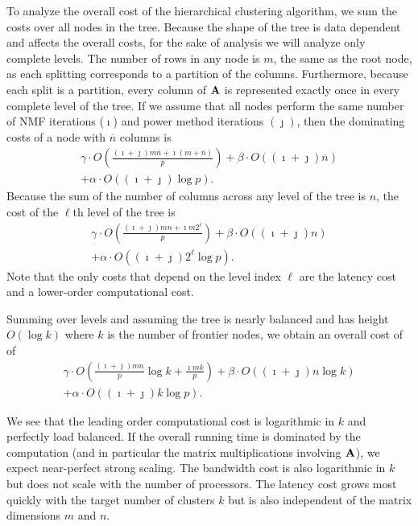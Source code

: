 \documentclass[conference,compsoc]{IEEEtran}
\begin{document}
To analyze the overall cost of the hierarchical clustering algorithm, we sum the costs over all nodes in the tree.
Because the shape of the tree is data dependent and affects the overall costs, for the sake of analysis we will analyze only complete levels.
The number of rows in any node is $m$, the same as the root node, as each splitting corresponds to a partition of the columns.
Furthermore, because each split is a partition, every column of $\M{A}$ is represented exactly once in every complete level of the tree.
If we assume that all nodes perform the same number of NMF iterations ($\imath$) and power method iterations $(\jmath)$, then the dominating costs of a node with $\overline{n}$ columns is
\begin{equation*}
\label{eq:nodecost}
\begin{split}
\gamma \cdot O\left( \frac{(\imath+\jmath) m\overline{n} + \imath (m+\overline{n}) }{p} \right) + \beta \cdot O((\imath+\jmath) \overline{n}) \\ + \alpha \cdot O((\imath+\jmath) \log p).
\end{split}
\end{equation*}
Because the sum of the number of columns across any level of the tree is $n$, the cost of the $\ell$th level of the tree is
\begin{equation}
\label{eq:levelcost}
\begin{split}
\gamma \cdot O\left( \frac{(\imath+\jmath) mn + \imath m 2^\ell}{p} \right) + \beta \cdot O((\imath+\jmath) n) \\ + \alpha \cdot O((\imath+\jmath) 2^\ell \log p).
\end{split}
\end{equation}
Note that the only costs that depend on the level index $\ell$ are the latency cost and a lower-order computational cost.

Summing over levels and assuming the tree is nearly balanced and has height $O(\log k)$ where $k$ is the number of frontier nodes, we obtain an overall cost of  of
\begin{equation}
\label{eq:treecost}
\begin{split}
\gamma \cdot O\left( \frac{(\imath+\jmath) mn}{p}  \log k + \frac{\imath mk}{p} \right) + \beta \cdot O((\imath+\jmath) n \log k) \\ + \alpha \cdot O((\imath+\jmath) k \log p).
\end{split}
\end{equation}

We see that the leading order computational cost is logarithmic in $k$ and perfectly load balanced.
If the overall running time is dominated by the computation (and in particular the matrix multiplications involving $\M{A}$), we expect near-perfect strong scaling.
The bandwidth cost is also logarithmic in $k$ but does not scale with the number of processors.
The latency cost grows most quickly with the target number of clusters $k$ but is also independent of the matrix dimensions $m$ and $n$.
\end{document}
